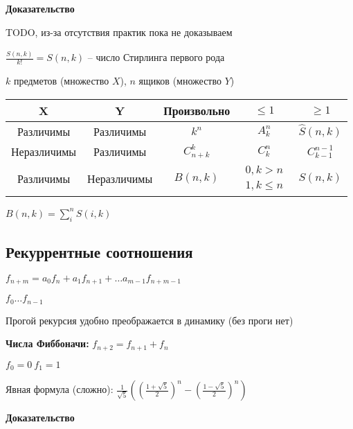 \documentclass[14pt, letter paper]{article}
\begin{document}
\begin{center}
    \textbf{Доказательство}
\end{center}

TODO, из-за отсутствия практик пока не доказываем

$\frac{\hat{S}(n,k)}{k!} = S(n,k)$ -- число Стирлинга первого рода

$k$ предметов (множество $X$), $n$ ящиков (множество $Y$)

\begin{center}
    \begin{tabular}{|c|c|c|c|c|}
        \hline
        X & Y & Произвольно & $\leq 1$ & $\geq 1$ \\
        \hline
        Различимы & Различимы & $k^n$ & $A_k^n$ & $\hat{S}(n, k)$ \\
        \hline
        Неразличимы & Различимы & $C_{n+k}^k$ & $C_k^n$ & $C_{k-1}^{n-1}$ \\
        \hline
        Различимы & Неразличимы & $B(n, k)$ & $\begin{gathered} 0, k > n \\ 1, k \leq n \end{gathered}$ & $S(n, k)$ \\
        \hline
    \end{tabular}
\end{center}

$B(n, k) = \sum\limits_i^n S(i, k)$

\begin{center}
    \section*{Рекуррентные соотношения}
\end{center}

$f_{n+m} = a_0f_n + a_1f_{n+1} + \ldots a_{m-1}f_{n+m-1}$

$f_0 \ldots f_{n-1}$

Прогой рекурсия удобно преображается в динамику (без проги нет)

\vspace{5mm}

\textbf{Числа Фиббоначи:} $f_{n+2} = f_{n+1} + f_n$

$f_0 = 0\ f_1 = 1$

Явная формула (сложно): $\frac{1}{\sqrt{5}}((\frac{1 + \sqrt{5}}{2})^n - (\frac{1 - \sqrt{5}}{2})^n)$

\begin{center}
    \textbf{Доказательство}
\end{center}
\end{document}

